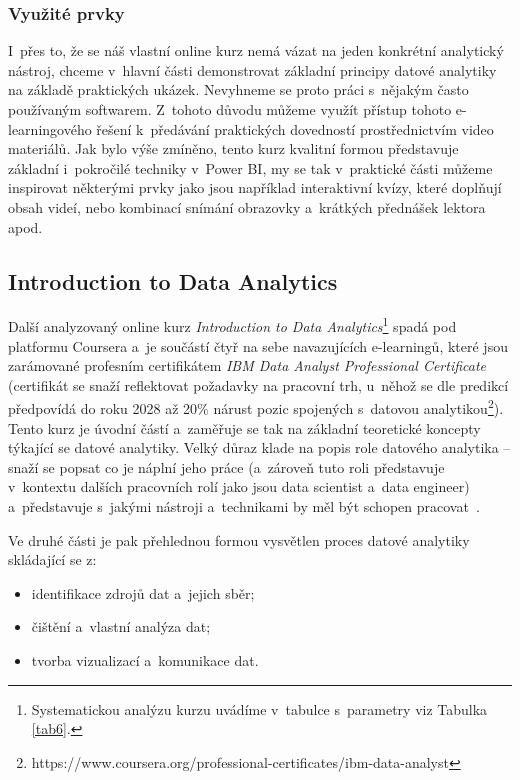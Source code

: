 \hypertarget{vyuux17eituxe9-prvky-4}{%
\subsubsection{Využité prvky}\label{vyuux17eituxe9-prvky-4}}

I~přes to, že se náš vlastní online kurz nemá vázat na jeden konkrétní analytický nástroj, chceme v~hlavní části demonstrovat základní principy datové analytiky na základě praktických ukázek. Nevyhneme se proto práci s~nějakým často používaným softwarem. Z~tohoto důvodu můžeme využít přístup tohoto e-learningového řešení k~předávání praktických dovedností prostřednictvím video materiálů. Jak bylo výše zmíněno, tento kurz kvalitní formou představuje základní i~pokročilé techniky v~Power BI, my se tak v~praktické části můžeme inspirovat některými prvky jako jsou například interaktivní kvízy, které doplňují obsah videí, nebo kombinací snímání obrazovky a~krátkých přednášek lektora apod.

\hypertarget{introduction-to-data-analytics}{%
\subsection{Introduction to Data Analytics}\label{introduction-to-data-analytics}}

Další analyzovaný online kurz \emph{Introduction to Data Analytics}\footnote{Systematickou analýzu kurzu uvádíme v~tabulce s~parametry viz Tabulka \ref{tab6}.} spadá pod platformu Coursera a~je součástí čtyř na sebe navazujících e-learningů, které jsou zarámované profesním certifikátem \emph{IBM Data Analyst Professional Certificate} (certifikát se snaží reflektovat požadavky na pracovní trh, u~něhož se dle predikcí předpovídá do roku 2028 až 20\% nárust pozic spojených s~datovou analytikou\footnote{https://www.coursera.org/professional-certificates/ibm-data-analyst}). Tento kurz je úvodní částí a~zaměřuje se tak na základní teoretické koncepty týkající se datové analytiky. Velký důraz klade na popis role datového analytika -- snaží se popsat co je náplní jeho práce (a~zároveň tuto roli představuje v~kontextu dalších pracovních rolí jako jsou data scientist a~data engineer) a~představuje s~jakými nástroji a~technikami by měl být schopen pracovat~\parencite{course6}.

Ve druhé části je pak přehlednou formou vysvětlen proces datové analytiky skládající se z:

\begin{itemize}
\tightlist
\item
  identifikace zdrojů dat a~jejich sběr;
\item
  čištění a~vlastní analýza dat;
\item
  tvorba vizualizací a~komunikace dat.
\end{itemize}

